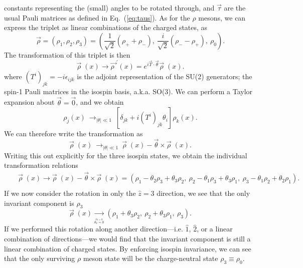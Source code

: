 \documentclass[11pt,a4paper,twoside]{carrollthesis}
\newcommand{\be}{\begin{equation}}
\newcommand{\ee}{\end{equation}}
\newcommand{\bea}{\begin{eqnarray}}
\newcommand{\eea}{\end{eqnarray}}
\newcommand{\reci}[1]{\frac{1}{#1}}
\newcommand{\emdash}{\hspace{1pt}---\hspace{1pt}}
\begin{document}
constants representing the (small) angles to be rotated through, and
$\vec{\tau}$ are the usual Pauli matrices as defined in
Eq.~(\ref{eq:taus}). As for the $\rho$ mesons, we can express the
triplet as linear combinations of the charged states, as
%
\be \vec{\rho} = (\rho_1,\rho_2,\rho_3) = \left(
\reci{\sqrt{2}}(\rho_+ + \rho_-),\ \frac{i}{\sqrt{2}}(\rho_- -
\rho_+),\ \rho_0 \right).  \ee
%
The transformation of this triplet is then
%
\be \vec{\rho}\; (x) \to \vec{\rho\; }^\prime(x) =
e^{i\vec{T}\cdot\vec{\theta} } \vec{\rho}\; (x).  \ee
%
where $(T^i)_{jk} = -i\epsilon_{ijk}$ is the adjoint representation of
the SU(2) generators; the spin-1 Pauli matrices in the isospin basis,
a.k.a. SO(3). We can perform a Taylor expansion about
$\vec{\theta}=\vec{0}$, and we obtain
%
\be \rho_j(x) 
\ \mathop{\longrightarrow}_{|\theta| \ll 1} \ 
\left[\delta_{jk} + i
  (T^i)_{jk}\theta_i\right]\rho_k(x). \ee
%
We can therefore write the transformation as
%
\be \vec{\rho}\; (x) 
\ \mathop{\longrightarrow}_{|\theta| \ll 1} \ \vec{\rho}\; (x) -
\vec{\theta} \times \vec{\rho}\; (x).  \ee
%
Writing this out explicitly for the three isospin states, we
obtain the individual transformation relations
%
\bea \nonumber
&&\vec{\rho}\; (x) \to \vec{\rho}\; (x) -
  \vec{\theta} \times \vec{\rho}\; (x) =
  ( \rho_1 - \theta_2\rho_3 + \theta_3\rho_2,\ \rho_2 - \theta_1\rho_3
  + \theta_3\rho_1,\ \rho_3 - \theta_1\rho_2 + \theta_2\rho_1 ).\\[2mm]
&&
\eea
%
If we now consider the rotation in only the $\hat{z}=\hat{3}$
direction, we see that the only invariant component is $\rho_3$
%
\be \vec{\rho}\; (x) 
\xrightarrow[{}_{\stackrel{\theta1 = 0}{\theta_2 = 0}}]{} 
\left(\rho_1 + \theta_3\rho_2,\ \rho_2 +
\theta_3\rho_1,\ \rho_3\right).  \ee
%
If we performed this rotation along another direction\emdash i.e. $\hat{1}$,
 $\hat{2}$, or a linear combination of directions\emdash we would find
that the invariant component is still a linear combination of charged
states. By enforcing isospin invariance, we can see that the only
surviving $\rho$ meson state will be the charge-neutral state $\rho_3
\equiv \rho_0$.\par
%
\end{document}
